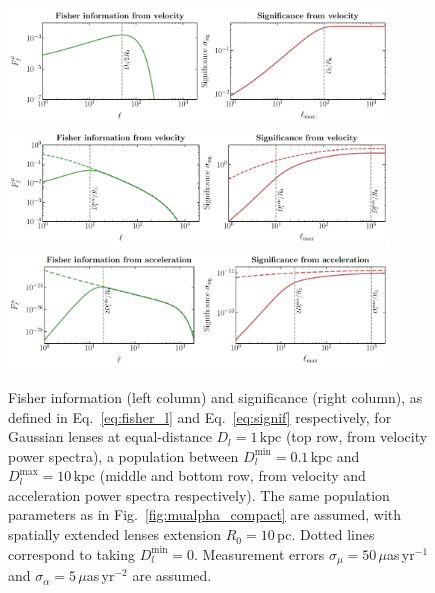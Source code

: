 \documentclass[twocolumn]{aastex63}
\begin{document}
\begin{figure}[htbp]
  \centering
  \includegraphics[width=0.9\textwidth]{plots/fisher_mu_single}
  \includegraphics[width=0.9\textwidth]{plots/fisher_mu}
  \includegraphics[width=0.9\textwidth]{plots/fisher_alpha}
  \caption{Fisher information (left column) and significance (right column), as defined in Eq.~\ref{eq:fisher_l} and Eq.~\ref{eq:signif} respectively, for Gaussian lenses at equal-distance $D_l=1\,\mathrm{kpc}$ (top row, from velocity power spectra), a population between $D_{l}^{\mathrm{min}}=0.1\,\mathrm{kpc}$ and $D_{l}^{\mathrm{max}}=10\,\mathrm{kpc}$ (middle and bottom row, from velocity and acceleration power spectra respectively). The same population parameters as in Fig.~\ref{fig:mualpha_compact} are assumed, with spatially extended lenses extension $R_0=10$\,pc. Dotted lines correspond to taking $D_l^\mathrm{min}=0$. Measurement errors $\sigma_\mu=50\,\mu$as\,yr$^{-1}$ and $\sigma_\alpha=5\,\mu$as\,yr$^{-2}$ are assumed.} 
  \label{fig:fisher_sig}
\end{figure}
\end{document}
